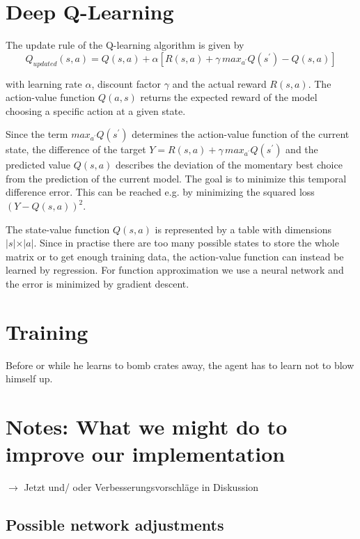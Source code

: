 \documentclass[a4paper ,12pt]{report}
\begin{document}
	\section*{Deep Q-Learning}
	The update rule of the Q-learning algorithm is given by
	\begin{equation}
	Q_{updated}(s,a) = Q(s,a) + \alpha\left[R(s,a) + \gamma \, max_{a^{\prime}} Q\left(s^{\prime}\right) - Q(s,a)\right]
	\end{equation}

	with learning rate $\alpha$, discount factor $\gamma$ and the actual reward $R(s,a)$. The action-value function $Q(a,s)$ returns the expected reward of the model choosing a specific action at a given state.
	
	Since the term $max_{a^{\prime}} Q\left(s^{\prime}\right)$ determines the action-value function of the current state, the difference of the target $Y = R(s,a) + \gamma \, max_{a^{\prime}} Q\left(s^{\prime}\right)$ and the predicted value $Q(s,a)$ describes the deviation of the momentary best choice from the prediction of the current model. The goal is to minimize this temporal difference error. This can be reached e.g. by minimizing the squared loss $(Y-Q(s,a))^2$.\cite{UBHD-68505368}
	
	\vspace{0.5cm}
	
	The state-value function $Q(s, a)$ is represented by a table with dimensions $\lvert s \lvert \times \lvert a \lvert $. Since in practise there are too many possible states to store the whole matrix or to get enough training data, the action-value function can instead be learned by regression. For function approximation we use a neural network and the error is minimized by gradient descent. \cite{Lecture}
	
	\section{Training}
	Before or while he learns to bomb crates away, the agent has to learn not to blow himself up.
	
	\newpage
	
	\section*{Notes: What we might do to improve our implementation}
	$\rightarrow$ Jetzt und/ oder Verbesserungsvorschläge in Diskussion
	
	\subsection*{Possible network adjustments}
	
\end{document}

